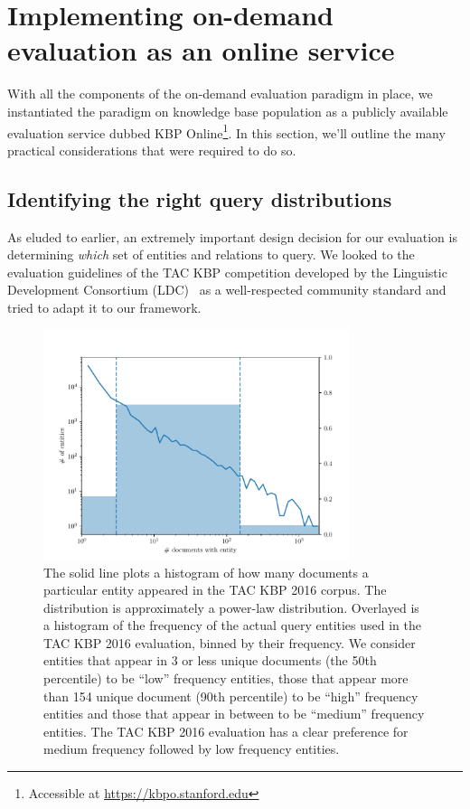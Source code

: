 \section{\label{sec:kbpo:kbpo} Implementing on-demand evaluation as an online service}

With all the components of the on-demand evaluation paradigm in place, we instantiated the paradigm on knowledge base population as a publicly available evaluation service dubbed KBP Online\footnote{Accessible at \url{https://kbpo.stanford.edu}}.
In this section, we'll outline the many practical considerations that were required to do so.

\subsection{Identifying the right query distributions}
As eluded to earlier, an extremely important design decision for our evaluation is determining \textit{which} set of entities and relations to query.
We looked to the evaluation guidelines of the TAC KBP competition developed by the Linguistic Development Consortium (LDC)~\citep{ellis2015overview,?} as a well-respected community standard and tried to adapt it to our framework.

\begin{figure}
  \centering
  \includegraphics[width=0.8\textwidth]{figures/analysis/distribution}
  \caption[TAC KBP 2016 Query entity distribution]{\label{fig:kbpo:distribution}
    The solid line plots a histogram of how many documents a particular entity appeared in the TAC KBP 2016 corpus.
    The distribution is approximately a power-law distribution.
    Overlayed is a histogram of the frequency of the actual query entities used in the TAC KBP 2016 evaluation, binned by their frequency. We consider entities that appear in 3 or less unique documents (the 50th percentile) to be ``low'' frequency entities, those that appear more than 154 unique document (90th percentile) to be ``high'' frequency entities and those that appear in between to be ``medium'' frequency entities.
    The TAC KBP 2016 evaluation has a clear preference for medium frequency followed by low frequency entities.
  }
\end{figure}

